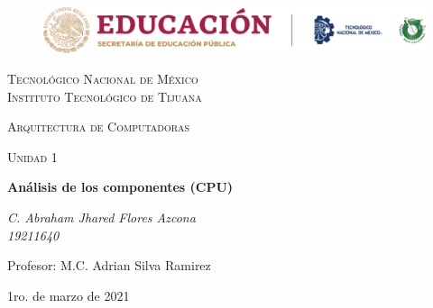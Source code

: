 \documentclass[letterpaper, 12pt]{article}
\begin{document}
    
    \begin{titlepage}
        \begin{figure}[ht]
            \centering
            \includegraphics[width=15cm]{logosITT.png}
        \end{figure}
        \centering
        {\scshape\LARGE Tecnológico Nacional de México\\Instituto Tecnológico de Tijuana\par}
        \vspace{1cm}
        {\scshape\Large Arquitectura de Computadoras\par}
        \vspace{1cm}
        {\scshape\Large Unidad 1\par}
        \vspace{1.5cm}
        {\huge\bfseries Análisis de los componentes (CPU)\par}
        \vspace{2cm}
        {\Large\itshape C. Abraham Jhared Flores Azcona\\19211640\par}
        \vfill
        Profesor: M.C. Adrian Silva Ramirez\par
    
        \vfill

        {\large 1ro. de marzo de 2021}
    \end{titlepage}

    \newpage
        \thispagestyle{empty}
        \tableofcontents
        \listoffigures
\end{document}
